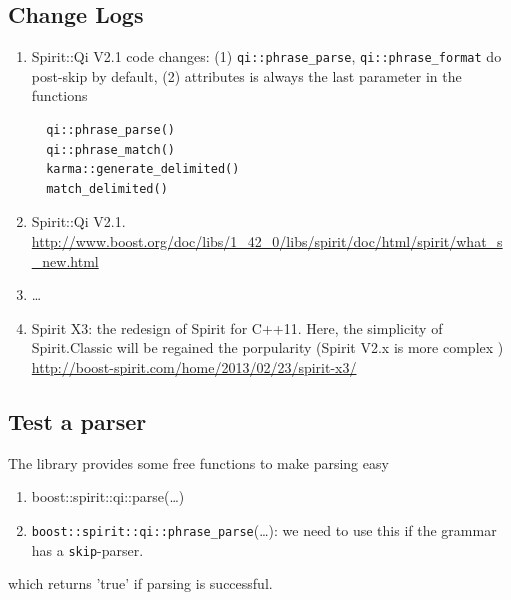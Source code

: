 \subsection{Change Logs}

\begin{enumerate}
  \item  Spirit::Qi V2.1 code changes: (1)
  \verb!qi::phrase_parse!, \verb!qi::phrase_format! do post-skip by default, (2)
  attributes is always the last parameter in the functions
  \begin{verbatim}
  qi::phrase_parse()
  qi::phrase_match() 
  karma::generate_delimited()
  match_delimited()
  \end{verbatim}
  
  \item Spirit::Qi V2.1.
  \url{http://www.boost.org/doc/libs/1_42_0/libs/spirit/doc/html/spirit/what_s_new.html}
  
  \item \ldots
  
  \item Spirit X3: the redesign of Spirit for C++11. Here, the
  simplicity of Spirit.Classic will be regained the porpularity (Spirit V2.x is
  more complex )
  \url{http://boost-spirit.com/home/2013/02/23/spirit-x3/}
\end{enumerate}

\subsection{Test a parser}

The library provides some free functions to make parsing easy
\begin{enumerate}
  \item boost::spirit::qi::parse(\ldots)
  \item \verb!boost::spirit::qi::phrase_parse!(\ldots): we need to use this if
  the grammar has a \verb!skip!-parser.
\end{enumerate}
which returns 'true' if parsing is successful.

